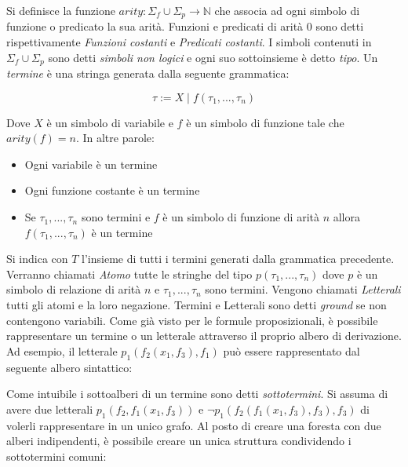 \documentclass[./main.tex]{subfiles}
\begin{document}
Si definisce la funzione $arity : \Sigma_f \cup \Sigma_p \rightarrow \mathbb{N}$ che associa ad ogni simbolo di funzione o predicato la sua arità.
Funzioni e predicati di arità 0 sono detti rispettivamente \textit{Funzioni costanti} e \textit{Predicati costanti}.
I simboli contenuti in $\Sigma_f \cup \Sigma_p$ sono detti \textit{simboli non logici} e ogni suo sottoinsieme è detto \textit{tipo}.
Un \textit{termine} è una stringa generata dalla seguente grammatica:

$$ \tau := X \mid f(\tau_1, ..., \tau_n) $$

Dove $X$ è un simbolo di variabile e $f$ è un simbolo di funzione tale che $arity(f) = n$. In altre parole:
\begin{itemize}
  \item Ogni variabile è un termine
  \item Ogni funzione costante è un termine
  \item Se $\tau_1, ..., \tau_n$ sono termini e $f$ è un simbolo di funzione di arità $n$ allora $f(\tau_1, ..., \tau_n)$ è un termine
\end{itemize}

Si indica con $T$ l'insieme di tutti i termini generati dalla grammatica precedente.
Verranno chiamati \textit{Atomo} tutte le stringhe del tipo $p(\tau_1, ..., \tau_n)$ dove $p$ è un simbolo di relazione
di arità $n$ e $\tau_1, ..., \tau_n$ sono termini.
Vengono chiamati \textit{Letterali} tutti gli atomi e la loro negazione.
Termini e Letterali sono detti \textit{ground} se non contengono variabili.
Come già visto per le formule proposizionali, è possibile rappresentare un termine o un letterale
attraverso il proprio albero di derivazione. Ad esempio, il letterale $p_1(f_2(x_1, f_3), f_1)$ può essere rappresentato dal seguente albero sintattico:

\begin{center}
\end{center}

Come intuibile i sottoalberi di un termine sono detti \textit{sottotermini}. Si assuma di avere due letterali $p_1(f_2, f_1(x_1, f_3))$ e 
$\lnot p_1(f_2(f_1(x_1, f_3), f_3), f_3)$ di volerli rappresentare in un unico grafo. Al posto di creare una foresta con due alberi indipendenti,
è possibile creare un unica struttura condividendo i sottotermini comuni:
\end{document}
